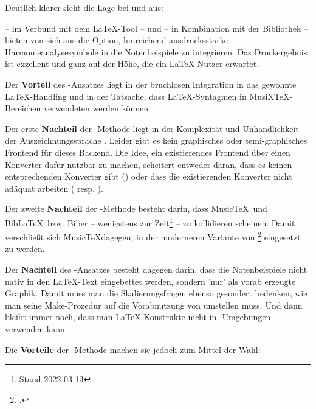 Deutlich klarer sieht die Lage bei  und
 aus:

 -- im Verbund mit dem \LaTeX-Tool  --
und  -- in Kombination mit der 
Bibliothek  -- bieten von sich aus die Option, hinreichend
ausdrucksstarke Harmonieanalysesymbole in die Notenbeispiele zu integrieren.
Das Druckergebnis ist exzellent und ganz auf der Höhe, die ein \LaTeX-Nutzer
erwartet.

Der \textbf{Vorteil} des -Ansatzes liegt in
der bruchlosen Integration in das gewohnte \LaTeX-Handling und in der Tatsache,
dass \LaTeX-Syntagmen in MusiX\TeX-Bereichen verwendeten werden können.

Der erste \textbf{Nachteil} der -Methode liegt in
der Komplexität und Unhandlichkeit der Auszeichnungssprache .
Leider gibt es kein graphisches oder semi-graphisches Frontend für dieses
Backend. Die Idee, ein existierendes Frontend über einen Konverter dafür nutzbar
zu machen, scheitert entweder daran, dass es keinen entsprechenden Konverter
gibt () oder dass die existierenden Konverter nicht adäquat
arbeiten ( resp. ).

Der zweite \textbf{Nachteil} der -Methode besteht darin, dass Music\TeX\ und Bib\LaTeX\ bzw. Biber -- wenigstens zur Zeit\footnote{Stand 2022-03-13} -- zu kollidieren scheinen. Damit verschließt sich Music\TeX dagegen, in der moderneren Variante von \footcite[vgl.][\nopage wp.]{Reincke2022a} eingesetzt zu werden.

Der \textbf{Nachteil} des -Ansatzes besteht
dagegen darin, dass die Notenbeispiele nicht nativ in den \LaTeX-Text
eingebettet werden, sondern 'nur' als vorab erzeugte Graphik. Damit muss man die
Skalierungsfragen ebenso gesondert bedenken, wie man seine Make-Prozedur auf die
Vorabnutzung von  umstellen muss. Und dann bleibt immer noch,
dass man \LaTeX-Konstrukte nicht in -Umgebungen verwenden kann.

Die \textbf{Vorteile} der -Methode machen sie
jedoch zum Mittel der Wahl:


